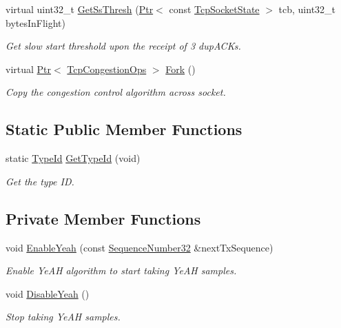 \begin{DoxyCompactItemize}
virtual uint32\+\_\+t \hyperlink{classns3_1_1TcpYeah_a08fe03bc4dca7f6c36f40ac770335c1a}{Get\+Ss\+Thresh} (\hyperlink{classns3_1_1Ptr}{Ptr}$<$ const \hyperlink{classns3_1_1TcpSocketState}{Tcp\+Socket\+State} $>$ tcb, uint32\+\_\+t bytes\+In\+Flight)
\begin{DoxyCompactList}\small\item\em Get slow start threshold upon the receipt of 3 dup\+A\+C\+Ks. \end{DoxyCompactList}\item 
virtual \hyperlink{classns3_1_1Ptr}{Ptr}$<$ \hyperlink{classns3_1_1TcpCongestionOps}{Tcp\+Congestion\+Ops} $>$ \hyperlink{classns3_1_1TcpYeah_a2e1b0c15fd6c8128cceb7fa395f49892}{Fork} ()
\begin{DoxyCompactList}\small\item\em Copy the congestion control algorithm across socket. \end{DoxyCompactList}\end{DoxyCompactItemize}
\subsection*{Static Public Member Functions}
\begin{DoxyCompactItemize}
\item 
static \hyperlink{classns3_1_1TypeId}{Type\+Id} \hyperlink{classns3_1_1TcpYeah_a4dec0c17fd88e785bec82271b5eae162}{Get\+Type\+Id} (void)
\begin{DoxyCompactList}\small\item\em Get the type ID. \end{DoxyCompactList}\end{DoxyCompactItemize}
\subsection*{Private Member Functions}
\begin{DoxyCompactItemize}
\item 
void \hyperlink{classns3_1_1TcpYeah_ad2f91d04a90f689b9cfd05a26de6472e}{Enable\+Yeah} (const \hyperlink{group__network_gacb2070e4e98d2d5135c9bede58f07a03}{Sequence\+Number32} \&next\+Tx\+Sequence)
\begin{DoxyCompactList}\small\item\em Enable Ye\+AH algorithm to start taking Ye\+AH samples. \end{DoxyCompactList}\item 
void \hyperlink{classns3_1_1TcpYeah_adc197c96e9d2c942f9a2b1c599c73f73}{Disable\+Yeah} ()
\begin{DoxyCompactList}\small\item\em Stop taking Ye\+AH samples. \end{DoxyCompactList}\end{DoxyCompactItemize}
